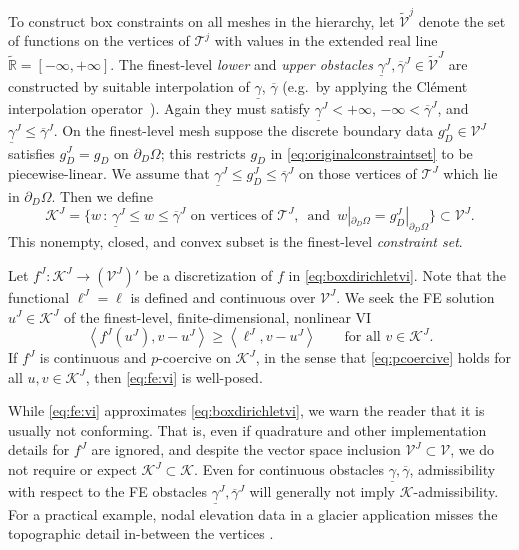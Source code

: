 \documentclass[review,hidelinks,onefignum,onetabnum]{siamart220329}
\newcommand{\RR}{\mathbb{R}}
\newcommand{\cK}{\mathcal{K}}
\newcommand{\ip}[2]{\left<#1,#2\right>}
\begin{document}
To construct box constraints on all meshes in the hierarchy, let $\tilde{\mathcal{V}}^j$ denote the set of functions on the vertices of $\mathcal{T}^j$ with values in the extended real line $\tilde{\RR} = [-\infty,+\infty]$.  The finest-level \emph{lower} and \emph{upper obstacles} $\underline{\gamma}^J, \overline{\gamma}^J \in \tilde{\mathcal{V}}^J$ are constructed by suitable interpolation of $\underline{\gamma}$, $\overline{\gamma}$ (e.g.~by applying the Cl\'ement interpolation operator~\cite{Carstensen2006}).  Again they must satisfy $\underline{\gamma}^J < +\infty$, $-\infty < \overline{\gamma}^J$, and $\underline{\gamma}^J \le \overline{\gamma}^J$.  On the finest-level mesh suppose the discrete boundary data $g_D^J \in \mathcal{V}^J$ satisfies $g_D^J = g_D$ on $\partial_D \Omega$; this restricts $g_D$ in \eqref{eq:originalconstraintset} to be piecewise-linear.  We assume that $\underline{\gamma}^J \le g_D^J \le \overline{\gamma}^J$ on those vertices of $\mathcal{T}^J$ which lie in $\partial_D \Omega$.  Then we define
\begin{equation}
\mathcal{K}^J = \big\{w\,:\,\underline{\gamma}^J \le w \le \overline{\gamma}^J \text{ on vertices of } \mathcal{T}^J, \, \text{ and } \, w|_{\partial_D\Omega} = g_D^J|_{\partial_D\Omega}\big\} \subset \mathcal{V}^J. \label{eq:fe:fineconstraintset}
\end{equation}
This nonempty, closed, and convex subset is the finest-level \emph{constraint set}.

Let $f^J:\mathcal{K}^J \to (\mathcal{V}^J)'$ be a discretization of $f$ in \eqref{eq:boxdirichletvi}.  Note that the functional $\ell^J=\ell$ is defined and continuous over $\mathcal{V}^J$.  We seek the FE solution $u^J \in \mathcal{K}^J$ of the finest-level, finite-dimensional, nonlinear VI
\begin{equation}
\ip{f^J(u^J)}{v-u^J} \ge \ip{\ell^J}{v-u^J} \qquad \text{for all } v\in \cK^J. \label{eq:fe:vi}
\end{equation}
If $f^J$ is continuous and $p$-coercive on $\mathcal{K}^J$, in the sense that \eqref{eq:pcoercive} holds for all $u,v \in \mathcal{K}^J$, then \eqref{eq:fe:vi} is well-posed.

While \eqref{eq:fe:vi} approximates \eqref{eq:boxdirichletvi}, we warn the reader that it is usually not conforming.  That is, even if quadrature and other implementation details for $f^J$ are ignored, and despite the vector space inclusion $\mathcal{V}^J \subset \mathcal{V}$, we do not require or expect $\mathcal{K}^J \subset \mathcal{K}$.  Even for continuous obstacles $\underline{\gamma}, \overline{\gamma}$, admissibility with respect to the FE obstacles $\underline{\gamma}^J, \overline{\gamma}^J$ will generally not imply $\mathcal{K}$-admissibility.  For a practical example, nodal elevation data in a glacier application misses the topographic detail in-between the vertices \cite{Bueler2016}.
\end{document}
